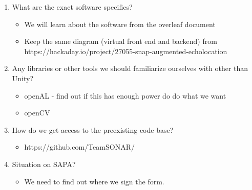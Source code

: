 \documentclass{scrreprt}
\begin{document}
\begin{enumerate}
\item What are the exact software specifics?
\begin{itemize}
\item We will learn about the software from the overleaf document
\item Keep the same diagram (virtual front end and backend) from https://hackaday.io/project/27055-snap-augmented-echolocation
\end{itemize}

\item Any libraries or other tools we should familiarize ourselves with other than Unity?
\begin{itemize}
\item openAL - find out if this has enough power do do what we want
\item openCV
\end{itemize}

\item How do we get access to the preexisting code base?
\begin{itemize}
\item https://github.com/TeamSONAR/
\end{itemize}

\item Situation on SAPA?
\begin{itemize}
\item We need to find out where we sign the form.
\end{itemize}
\end{enumerate}
\end{document}
